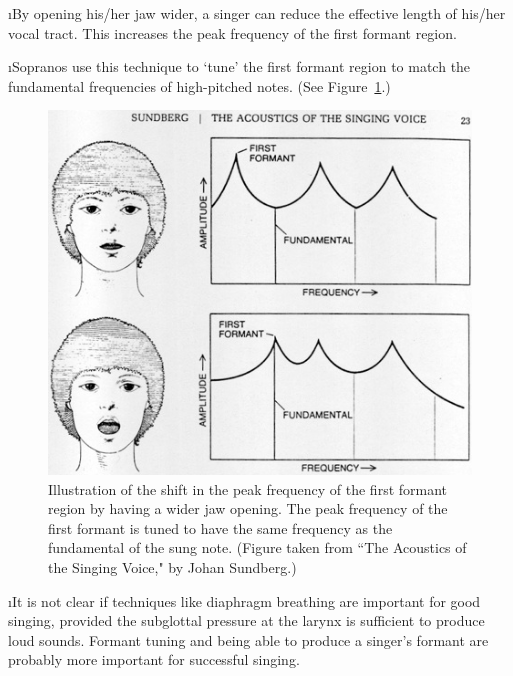 \i By opening his/her jaw wider, a singer can reduce 
the effective length of his/her vocal tract.
This increases the peak frequency of the first formant 
region.

\i Sopranos use this technique to `tune' the first 
formant region to match the fundamental frequencies 
of high-pitched notes. 
(See Figure~\ref{f:formanttuning}.)
%
\begin{figure}[htbp]
\begin{center}
\includegraphics[width=.8\textwidth]{formanttuning}
\caption{Illustration of the shift in the peak 
frequency of the first formant region by having 
a wider jaw opening.
The peak frequency of the first formant is tuned
to have the same frequency as the fundamental of
the sung note. 
(Figure taken from 
``The Acoustics of the Singing Voice," by 
Johan Sundberg.)}
\label{f:formanttuning}
\end{center}
\end{figure}
%

\i It is not clear if techniques like diaphragm breathing 
are important for good singing, provided the subglottal 
pressure at the larynx is sufficient to produce loud sounds.
Formant tuning and being able to produce a singer's formant
are probably more important for successful singing.

\ei

